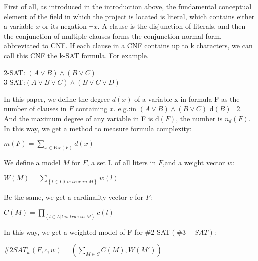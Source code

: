 \documentclass{sigchi}
\begin{document}
First of all, as introduced in the introduction above, the fundamental conceptual element of the field in which the project is located is literal, which contains either a variable $x$ or its negation $\neg x$. A clause is the disjunction of literals, and then the conjunction of multiple clauses forms the conjunction normal form, abbreviated to CNF. If each clause in a CNF contains up to k characters, we can call this CNF the k-SAT formula. For example.
\begin{center}
	2-SAT:  $\left ( A \vee B \right )\wedge \left ( B \vee C \right ) $\\3-SAT:$\left ( A \vee B\vee C \right )\wedge \left ( B \vee C\vee D \right )$
\end{center}
In this paper, we define the degree $d\left( x \right)$ of a variable x in formula F as the number of clauses in $F$ containing $x$.
e.g.:in $\left ( A \vee B \right )\wedge \left ( B \vee C \right ) $ d$\left( B \right)$=2.
And the maximum degree of  any variable in F is d$\left(F\right)$, the number is $n_{d}\left ( F \right )$.\\
In this way, we get a method to measure formula complexity:
\begin{center}
	$m\left(F\right)=\sum_{x\in Var\left(F\right)} d\left(x\right)$
\end{center}
We define a model $M$ for $F$, a set L of all liters in $F$,and a weight vector $w$:
\begin{center}
	$W\left ( M \right )=\sum_{\left \{ l\in L | l\;is\;true\;in\;M\right \}} w\left ( l \right )$
\end{center}
Be the same, we get a cardinality vector $c$ for $F$:
\begin{center}
	$C\left ( M \right )=\prod_{\left \{ l\in L | l\;is\;true\;in\;M\right \}} c\left ( l \right )$\\
\end{center}
In this way, we get a weighted model  of F for \#2-SAT$\left(\#3-SAT\right)$:
\begin{center}
	$\#2SAT_{w}(F, c, w)=\left ( \sum_{M\in S}C(M),W({M}') \right )$
\end{center}
\end{document}
